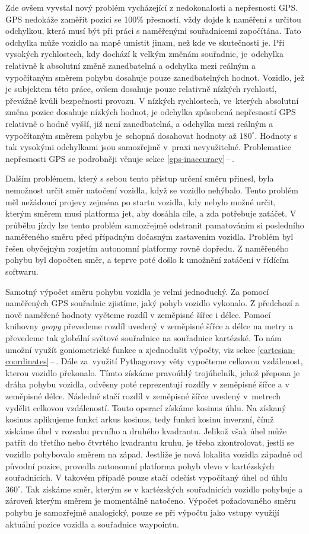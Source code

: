 \documentclass[czech, bachelor]{diploma}
\newcommand{\peteref}[1]{\ref{#1}\,--\,\nameref{#1}}
\begin{document}
Zde ovšem vyvstal nový problém vycházející z nedokonalosti a nepřesnosti GPS. GPS nedokáže zaměřit pozici se 100\% přesností,
vždy dojde k naměření s určitou odchylkou, která musí být při práci s naměřenými souřadnicemi započítána. Tato odchylka může
vozidlo na mapě umístit jinam, než kde ve skutečnosti je. Při vysokých rychlostech, kdy dochází k velkým změnám souřadnic,
je~odchylka relativně k absolutní změně zanedbatelná a odchylka mezi reálným a vypočítaným směrem pohybu dosahuje pouze
zanedbatelných hodnot. Vozidlo, jež je subjektem této práce, ovšem dosahuje pouze relativně nízkých rychlostí, převážně kvůli
bezpečnosti provozu. V nízkých rychlostech, ve~kterých absolutní změna pozice dosahuje nízkých hodnot, je odchylka způsobená
nepřesností GPS relativně o hodně vyšší, již není zanedbatelná, a odchylka mezi reálným a vypočítaným směrem pohybu je~schopná
dosahovat hodnoty až $180^{\circ}$. Hodnoty s tak vysokými odchylkami jsou samozřejmě v~praxi nevyužitelné. Problematice
nepřesnosti GPS se podrobněji věnuje sekce \peteref{gps-inaccuracy}.

Dalším problémem, který s sebou tento přístup určení směru přinesl, byla nemožnost určit směr natočení vozidla, když se vozidlo
nehýbalo. Tento problém měl nežádoucí projevy zejména po startu vozidla, kdy nebylo možné určit, kterým směrem musí platforma jet,
aby dosáhla cíle, a zda potřebuje zatáčet. V průběhu jízdy lze tento problém samozřejmě odstranit pamatováním si posledního
naměřeného směru před případným dočasným zastavením vozidla. Problém byl řešen obyčejným rozjetím autonomní platformy rovně
dopředu. Z naměřeného pohybu byl dopočten směr, a teprve poté došlo k umožnění zatáčení v řídícím softwaru.

Samotný výpočet směru pohybu vozidla je velmi jednoduchý. Za pomocí naměřených GPS souřadnic zjistíme, jaký pohyb vozidlo
vykonalo. Z předchozí a nově naměřené hodnoty vyčteme rozdíl v zeměpisné šířce i délce. Pomocí knihovny \emph{geopy} převedeme
rozdíl uvedený v zeměpisné šířce a délce na metry a převedeme tak globální světové souřadnice na souřadnice kartézské. To nám
umožní využít goniometrické funkce a zjednodušit výpočty, viz sekce \peteref{cartesian-coordinates}. Dále za~využití Pythagorovy
věty vypočteme celkovou vzdálenost, kterou vozidlo překonalo. Tímto získáme pravoúhlý trojúhelník, jehož přepona je dráha
pohybu vozidla, odvěsny poté reprezentují rozdíly v zeměpisné šířce a v zeměpisné délce. Následně stačí rozdíl v zeměpisné šířce
uvedený v~metrech vydělit celkovou vzdáleností. Touto operací získáme kosinus úhlu. Na získaný kosinus aplikujeme funkci arkus
kosinus, tedy funkci kosinu inverzní, čímž získáme úhel v rozsahu prvního a druhého kvadrantu. Jelikož však úhel může patřit do
třetího nebo čtvrtého kvadrantu kruhu, je třeba zkontrolovat, jestli se vozidlo pohybovalo směrem na západ. Jestliže je nová
lokalita vozidla západně od původní pozice, provedla autonomní platforma pohyb vlevo v kartézských souřadnicích. V takovém případě
pouze stačí odečíst vypočítaný úhel od úhlu $360^{\circ}$. Tak získáme směr, kterým se v kartézských souřadnicích vozidlo pohybuje
a zároveň kterým směrem je momentálně natočeno. Výpočet požadovaného směru pohybu je samozřejmě analogický, pouze se při výpočtu
jako vstupy využijí aktuální pozice vozidla a souřadnice waypointu.
\end{document}
